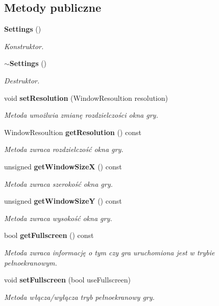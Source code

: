 \subsection*{Metody publiczne}
\begin{DoxyCompactItemize}
\item 
\textbf{ Settings} ()
\begin{DoxyCompactList}\small\item\em Konstruktor. \end{DoxyCompactList}\item 
\textbf{ $\sim$\+Settings} ()
\begin{DoxyCompactList}\small\item\em Destruktor. \end{DoxyCompactList}\item 
void \textbf{ set\+Resolution} (Window\+Resoultion resolution)
\begin{DoxyCompactList}\small\item\em Metoda umożlwia zmianę rozdzielczości okna gry. \end{DoxyCompactList}\item 
Window\+Resoultion \textbf{ get\+Resolution} () const
\begin{DoxyCompactList}\small\item\em Metoda zwraca rozdzielczość okna gry. \end{DoxyCompactList}\item 
unsigned \textbf{ get\+Window\+SizeX} () const
\begin{DoxyCompactList}\small\item\em Metoda zwraca szerokość okna gry. \end{DoxyCompactList}\item 
unsigned \textbf{ get\+Window\+SizeY} () const
\begin{DoxyCompactList}\small\item\em Metoda zwraca wysokość okna gry. \end{DoxyCompactList}\item 
bool \textbf{ get\+Fullscreen} () const
\begin{DoxyCompactList}\small\item\em Metoda zwraca informację o tym czy gra uruchomiona jest w trybie pełnoekranowym. \end{DoxyCompactList}\item 
void \textbf{ set\+Fullscreen} (bool use\+Fullscreen)
\begin{DoxyCompactList}\small\item\em Metoda włącza/wyłącza tryb pełnoekranowy gry. \end{DoxyCompactList}\item 

\end{DoxyCompactItemize}
